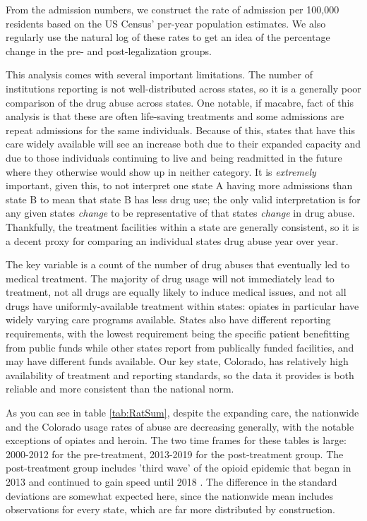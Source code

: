 \documentclass{article}
\begin{document}
From the admission numbers, we construct the rate of admission per 100,000 residents based on the US Census' per-year population estimates. We also regularly use the natural log of these rates to get an idea of the percentage change in the pre- and post-legalization groups.

This analysis comes with several important limitations. The number of institutions reporting is not well-distributed across states, so it is a generally poor comparison of the drug abuse across states. One notable, if macabre, fact of this analysis is that these are often life-saving treatments and some admissions are repeat admissions for the same individuals. Because of this, states that have this care widely available will see an increase both due to their expanded capacity and due to those individuals continuing to live and being readmitted in the future where they otherwise would show up in neither category. It is \emph{extremely} important, given this, to not interpret one state A having more admissions than state B to mean that state B has less drug use; the only valid interpretation is for any given states \emph{change} to be representative of that states \emph{change} in drug abuse. Thankfully, the treatment facilities within a state are generally consistent, so it is a decent proxy for comparing an individual states drug abuse year over year. 

The key variable is a count of the number of drug abuses that eventually led to medical treatment. The majority of drug usage will not immediately lead to treatment, not all drugs are equally likely to induce medical issues, and not all drugs have uniformly-available treatment within states: opiates in particular have widely varying care programs available. States also have different reporting requirements, with the lowest requirement being the specific patient benefitting from public funds while other states report from publically funded facilities, and may have different funds available. Our key state, Colorado, has relatively high availability of treatment and reporting standards, so the data it provides is both reliable and more consistent than the national norm.



As you can see in table \ref{tab:RatSum}, despite the expanding care, the nationwide and the Colorado usage rates of abuse are decreasing generally, with the notable exceptions of opiates and heroin.  The two time frames for these tables is large: 2000-2012 for the pre-treatment, 2013-2019 for the post-treatment group. The post-treatment group includes 'third wave' of the opioid epidemic that began in 2013 and continued to gain speed until 2018 \citep{CDCOpEpi}. The difference in the standard deviations are somewhat expected here, since the nationwide mean includes observations for every state, which are far more distributed by construction.
\end{document}
